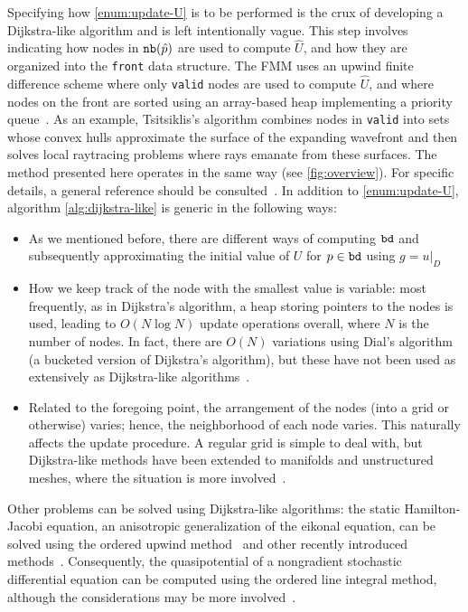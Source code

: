 \documentclass[eikonal.tex]{subfiles}
\begin{document}
Specifying how \cref{enum:update-U} is to be performed is the crux of
developing a Dijkstra-like algorithm and is left intentionally
vague. This step involves indicating how nodes in $\texttt{nb}(\hat{p})$ are
used to compute $\hat{U}$, and how they are organized into the
\texttt{front} data structure. The FMM uses an upwind finite
difference scheme where only \texttt{valid} nodes are used to compute
$\hat{U}$, and where nodes on the front are sorted using an
array-based heap implementing a priority
queue~\cite{sethian1996fast}. As an example, Tsitsiklis's algorithm
combines nodes in \texttt{valid} into sets whose convex hulls
approximate the surface of the expanding wavefront and then solves
local raytracing problems where rays emanate from these surfaces. The
method presented here operates in the same way (see
\cref{fig:overview}). For specific details, a general reference should
be consulted~\cite{sethian1999level}. In addition to
\cref{enum:update-U}, algorithm \cref{alg:dijkstra-like} is generic in
the following ways:
\begin{itemize}
\item As we mentioned before, there are different ways of computing
  $\texttt{bd}$ and subsequently approximating the initial value of $U$
  for $p \in \texttt{bd}$ using
  $g = \left. u \right|_D$~\cite{chopp2001some}
\item How we keep track of the node with the smallest value is
  variable: most frequently, as in Dijkstra's algorithm, a heap
  storing pointers to the nodes is used, leading to $O(N \log N)$
  update operations overall, where $N$ is the number of nodes. In
  fact, there are $O(N)$ variations using Dial's algorithm (a bucketed
  version of Dijkstra's algorithm), but these have not been used as
  extensively as Dijkstra-like
  algorithms~\cite{tsitsiklis1995efficient,kim2001calo}.
\item Related to the foregoing point, the arrangement of the nodes
  (into a grid or otherwise) varies; hence, the neighborhood of each
  node varies. This naturally affects the update procedure. A regular
  grid is simple to deal with, but Dijkstra-like methods have been
  extended to manifolds and unstructured meshes, where the situation
  is more
  involved~\cite{kimmel1998computing,sethian2000fast,bronstein2008numerical}.
\end{itemize}
Other problems can be solved using Dijkstra-like algorithms: the
static Hamilton-Jacobi equation, an anisotropic generalization of the
eikonal equation, can be solved using the ordered upwind
method~\cite{sethian2003ordered} and other recently introduced
methods~\cite{mirebeau2014efficient,mirebeau2014anisotropic}. Consequently,
the quasipotential of a nongradient stochastic differential equation
can be computed using the ordered line integral method, although the
considerations may be more
involved~\cite{dahiya2017ordered,dahiya2018ordered,yang2018computing}.
\end{document}

